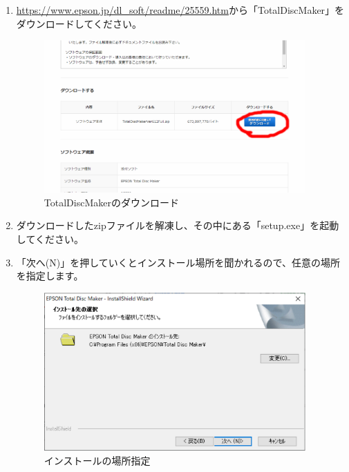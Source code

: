 \documentclass[11pt,a4paper]{jsarticle}
\begin{document}
                    \begin{enumerate}
                        \item \url{https://www.epson.jp/dl_soft/readme/25559.htm}から「TotalDiscMaker」をダウンロードしてください。
                        \begin{figure}[H]
                            \begin{center}
                            \includegraphics[width=10.0cm]{./image/tdm01.eps}
                            \caption{TotalDiscMakerのダウンロード}
                            \label{fig:tdm01}
                            \end{center}
                        \end{figure}
                        \item ダウンロードしたzipファイルを解凍し、その中にある「setup.exe」を起動してください。
                        \item 「次へ(N)」を押していくとインストール場所を聞かれるので、任意の場所を指定します。
                        \begin{figure}[H]
                            \begin{center}
                            \includegraphics[width=10.0cm]{./image/tdm02.eps}
                            \caption{インストールの場所指定}
                            \label{fig:tdm02}
                            \end{center}

\end{figure}
\end{enumerate}
\end{document}
